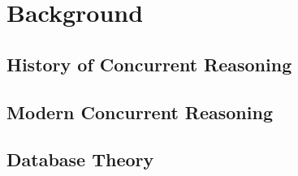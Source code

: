 \chapter{Background}

\section{History of Concurrent Reasoning}



\newpage

\section{Modern Concurrent Reasoning}



\newpage

\section{Database Theory}


